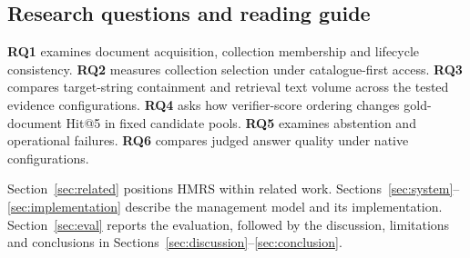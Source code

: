 \subsection{Research questions and reading guide}
\label{sec:rq}

 \textbf{RQ1} examines document acquisition, collection membership and
lifecycle consistency. \textbf{RQ2} measures collection selection under
catalogue-first access. \textbf{RQ3} compares target-string containment
and retrieval text volume across the tested evidence configurations.
\textbf{RQ4} asks how verifier-score ordering changes gold-document
Hit@5 in fixed candidate pools. \textbf{RQ5} examines abstention and
operational failures. \textbf{RQ6} compares judged answer quality under
native configurations.

Section~\ref{sec:related} positions HMRS within related work.
Sections~\ref{sec:system}--\ref{sec:implementation} describe the management
model and its implementation. Section~\ref{sec:eval} reports the evaluation,
followed by the discussion, limitations and conclusions in
Sections~\ref{sec:discussion}--\ref{sec:conclusion}.
